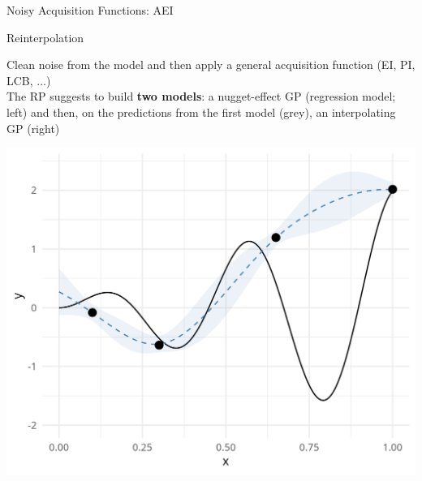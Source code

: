 \documentclass[11pt,compress,t,notes=noshow, xcolor=table]{beamer}
\begin{document}
\begin{vbframe}{Noisy Acquisition Functions: AEI}
\end{vbframe}

\begin{frame}{Reinterpolation}

 {
Clean noise from the model and then apply a general acquisition function (EI, PI, LCB, ...)\\
\vspace{1em}
The RP suggests to build \textbf{two models}: a nugget-effect GP (regression model; left) and then, on the predictions from the first model (grey), an interpolating GP (right)
}
 {
\begin{algorithm}[H]
\footnotesize
  \caption{Reinterpolation Procedure}
  \begin{algorithmic}[1]
  \end{algorithmic}
\end{algorithm}
}
\vfill
\begin{minipage}[b]{0.45\textwidth}
  \includegraphics[width = \textwidth]{figure_man/noisy_2.png}
\end{minipage}
\hfill
\begin{minipage}[b]{0.45\textwidth}

\end{minipage}
\end{frame}
\end{document}
